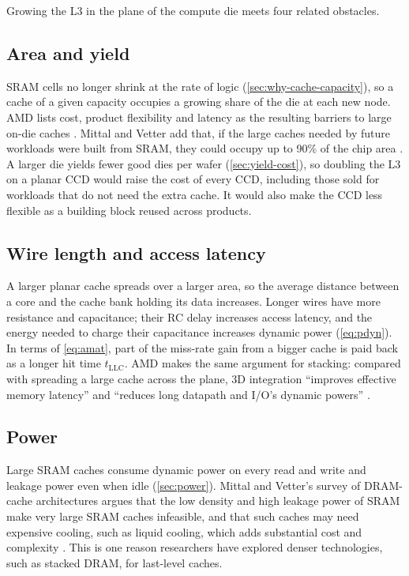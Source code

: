 Growing the L3 in the plane of the compute die meets four related obstacles.

\subsection{Area and yield}
SRAM cells no longer shrink at the rate of logic (\cref{sec:why-cache-capacity}), so a cache of a given capacity occupies a growing share of the die at each new node. AMD lists cost, product flexibility and latency as the resulting barriers to large on-die caches \cite[slide~6]{wuu2022vcache}. Mittal and Vetter add that, if the large caches needed by future workloads were built from SRAM, they could occupy up to 90\% of the chip area \cite[sec.~1]{mittalSurveyTechniquesArchitecting2016}. A larger die yields fewer good dies per wafer (\cref{sec:yield-cost}), so doubling the L3 on a planar CCD would raise the cost of every CCD, including those sold for workloads that do not need the extra cache. It would also make the CCD less flexible as a building block reused across products.

\subsection{Wire length and access latency}
A larger planar cache spreads over a larger area, so the average distance between a core and the cache bank holding its data increases. Longer wires have more resistance and capacitance; their RC delay increases access latency, and the energy needed to charge their capacitance increases dynamic power (\cref{eq:pdyn}). In terms of \cref{eq:amat}, part of the miss-rate gain from a bigger cache is paid back as a longer hit time $t_{\mathrm{LLC}}$. AMD makes the same argument for stacking: compared with spreading a large cache across the plane, 3D integration ``improves effective memory latency'' and ``reduces long datapath and I/O's dynamic powers'' \cite[slide~7]{wuu2022vcache}.

\subsection{Power}
Large SRAM caches consume dynamic power on every read and write and leakage power even when idle (\cref{sec:power}). Mittal and Vetter's survey of DRAM-cache architectures argues that the low density and high leakage power of SRAM make very large SRAM caches infeasible, and that such caches may need expensive cooling, such as liquid cooling, which adds substantial cost and complexity \cite[sec.~1]{mittalSurveyTechniquesArchitecting2016}. This is one reason researchers have explored denser technologies, such as stacked DRAM, for last-level caches.

